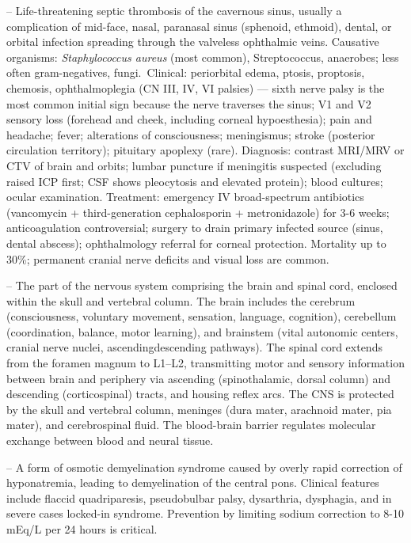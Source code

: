 -- Life-threatening septic thrombosis of the cavernous sinus, usually a complication of mid-face, nasal, paranasal sinus (sphenoid, ethmoid), dental, or orbital infection spreading through the valveless ophthalmic veins. Causative organisms: \emph{Staphylococcus aureus} (most common), Streptococcus, anaerobes; less often gram-negatives, fungi.\ Clinical: periorbital edema, ptosis, proptosis, chemosis, ophthalmoplegia (CN III, IV, VI palsies) — sixth nerve palsy is the most common initial sign because the nerve traverses the sinus; V1 and V2 sensory loss (forehead and cheek, including corneal hypoesthesia); pain and headache; fever; alterations of consciousness; meningismus; stroke (posterior circulation territory); pituitary apoplexy (rare). Diagnosis: contrast MRI/MRV or CTV of brain and orbits; lumbar puncture if meningitis suspected (excluding raised ICP first; CSF shows pleocytosis and elevated protein); blood cultures; ocular examination. Treatment: emergency IV broad-spectrum antibiotics (vancomycin + third-generation cephalosporin + metronidazole) for 3-6 weeks; anticoagulation controversial; surgery to drain primary infected source (sinus, dental abscess); ophthalmology referral for corneal protection. Mortality up to 30\%; permanent cranial nerve deficits and visual loss are common.

-- The part of the nervous system comprising the brain and spinal cord, enclosed within the skull and vertebral column. The brain includes the cerebrum (consciousness, voluntary movement, sensation, language, cognition), cerebellum (coordination, balance, motor learning), and brainstem (vital autonomic centers, cranial nerve nuclei, ascending\/descending pathways). The spinal cord extends from the foramen magnum to L1--L2, transmitting motor and sensory information between brain and periphery via ascending (spinothalamic, dorsal column) and descending (corticospinal) tracts, and housing reflex arcs. The CNS is protected by the skull and vertebral column, meninges (dura mater, arachnoid mater, pia mater), and cerebrospinal fluid. The blood-brain barrier regulates molecular exchange between blood and neural tissue.

-- A form of osmotic demyelination syndrome caused by overly rapid correction of hyponatremia, leading to demyelination of the central pons. Clinical features include flaccid quadriparesis, pseudobulbar palsy, dysarthria, dysphagia, and in severe cases locked-in syndrome. Prevention by limiting sodium correction to 8-10 mEq/L per 24 hours is critical.

